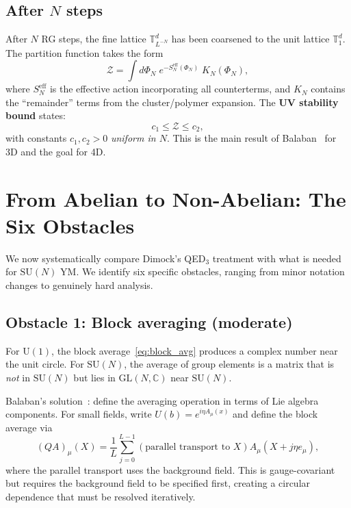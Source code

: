 \documentclass[11pt,a4paper]{article}
\theoremstyle{plain}
\theoremstyle{definition}
\theoremstyle{remark}
\newcommand{\T}{\mathbb{T}}
\newcommand{\SU}{\mathrm{SU}}
\newcommand{\U}{\mathrm{U}}
\newcommand{\cZ}{\mathcal{Z}}
\begin{document}
\subsection{After $N$ steps}

After $N$ RG steps, the fine lattice $\T_{L^{-N}}^d$
has been coarsened to the unit lattice $\T_1^d$.
The partition function takes the form
\begin{equation}\label{eq:after_N}
  \cZ = \int d\Phi_N \;
  e^{-S_N^{\text{eff}}(\Phi_N)}\;
  K_N(\Phi_N),
\end{equation}
where $S_N^{\text{eff}}$ is the effective action
incorporating all counterterms, and $K_N$ contains
the ``remainder'' terms from the cluster/polymer expansion.
The \textbf{UV stability bound} states:
\begin{equation}\label{eq:uv_stability}
  c_1 \le \cZ \le c_2,
\end{equation}
with constants $c_1, c_2 > 0$ \emph{uniform in $N$}.
This is the main result of Balaban~\cite{Bal85e}
for 3D and the goal for 4D.

\section{From Abelian to Non-Abelian:
  The Six Obstacles}\label{sec:abelian_to_nonabelian}

We now systematically compare Dimock's QED$_3$
treatment with what is needed for $\SU(N)$ YM.
We identify six specific obstacles, ranging from
minor notation changes to genuinely hard analysis.

\subsection{Obstacle 1: Block averaging (moderate)}
\label{sec:nonabelian_avg}

For $\U(1)$, the block average~\eqref{eq:block_avg} produces
a complex number near the unit circle. For $\SU(N)$,
the average of group elements is a matrix
that is \emph{not} in $\SU(N)$ but lies in
$\text{GL}(N, \mathbb{C})$ near $\SU(N)$.

Balaban's solution~\cite{Bal85a}: define the averaging
operation in terms of Lie algebra components.
For small fields, write $U(b) = e^{i\eta A_\mu(x)}$
and define the block average via
\begin{equation}\label{eq:lie_avg}
  (QA)_\mu(X) = \frac{1}{L}
  \sum_{j=0}^{L-1} \left(
  \text{parallel transport to } X\right)
  A_\mu(X + j\eta e_\mu),
\end{equation}
where the parallel transport uses the background field.
This is gauge-covariant but requires the background
field to be specified first, creating a circular
dependence that must be resolved iteratively.
\end{document}
